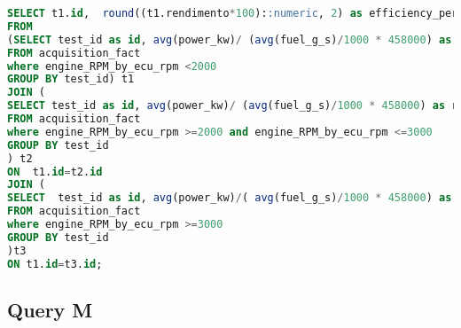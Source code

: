 \begin{lstlisting}[language=SQL]
SELECT t1.id,  round((t1.rendimento*100)::numeric, 2) as efficiency_perc_max2000rpm, round((t2.rendimento*100)::numeric,2) as efficiency_perc_max3000rpm, round((t3.rendimento*100)::numeric,2) as efficiency_perc_over3000rpm
FROM
(SELECT test_id as id, avg(power_kw)/ (avg(fuel_g_s)/1000 * 458000) as rendimento
FROM acquisition_fact
where engine_RPM_by_ecu_rpm <2000
GROUP BY test_id) t1
JOIN (
SELECT test_id as id, avg(power_kw)/ (avg(fuel_g_s)/1000 * 458000) as rendimento
FROM acquisition_fact
where engine_RPM_by_ecu_rpm >=2000 and engine_RPM_by_ecu_rpm <=3000
GROUP BY test_id
) t2
ON  t1.id=t2.id
JOIN (
SELECT  test_id as id, avg(power_kw)/( avg(fuel_g_s)/1000 * 458000) as rendimento
FROM acquisition_fact
where engine_RPM_by_ecu_rpm >=3000
GROUP BY test_id
)t3
ON t1.id=t3.id;
\end{lstlisting}

\subsection{Query M}
